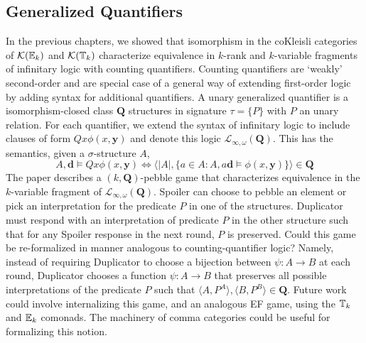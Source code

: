\subsection{Generalized Quantifiers}
In the previous chapters, we showed that isomorphism in the coKleisli categories of $\mathcal{K}({\mathbb{E}_{k}})$ and $\mathcal{K}({\mathbb{T}_{k}})$ characterize equivalence in $k$-rank and $k$-variable fragments of infinitary logic with counting quantifiers. Counting quantifiers are `weakly' second-order and are special case of a general way of extending first-order logic by adding syntax for additional quantifiers. A unary generalized quantifier is a isomorphism-closed class $\mathbf{Q}$ structures in signature $\tau = \{P\}$ with $P$ an unary relation. For each quantifier, we extend the syntax of infinitary logic to include clauses of form $Qx\phi(x,\mathbf{y})$ and denote this logic $\mathcal{L}_{\infty,\omega}(\mathbf{Q})$. This has the semantics, given a $\sigma$-structure $A$,  
$$A,\mathbf{d} \vDash Qx\phi(x,\mathbf{y}) \Leftrightarrow \langle |A|,\{a \in A: A,a\mathbf{d} \vDash \phi(x,\mathbf{y})\} \rangle \in \mathbf{Q} $$ 
The paper \cite{Kolaitis1995} describes a  $(k,\mathbf{Q})$-pebble game that characterizes equivalence in the $k$-variable fragment of $\mathcal{L}_{\infty,\omega}(\mathbf{Q})$. Spoiler can choose to pebble an element or pick an interpretation for the predicate $P$ in one of the structures. Duplicator must respond with an interpretation of predicate $P$ in the other structure such that for any Spoiler response in the next round, $P$ is preserved. Could this game be re-formalized in manner analogous to counting-quantifier logic? Namely, instead of requiring Duplicator to choose a bijection between $\psi:A \longrightarrow B$ at each round, Duplicator chooses a function $\psi:A \longrightarrow B$ that preserves all possible interpretations of the predicate $P$ such that $\langle A,P^{A} \rangle, \langle B,P^{B} \rangle \in \mathbf{Q}$. Future work could involve internalizing this game, and an analogous EF game, using the ${\mathbb{T}_{k}}$ and ${\mathbb{E}_{k}}$ comonads. The machinery of comma categories could be useful for formalizing this notion.
